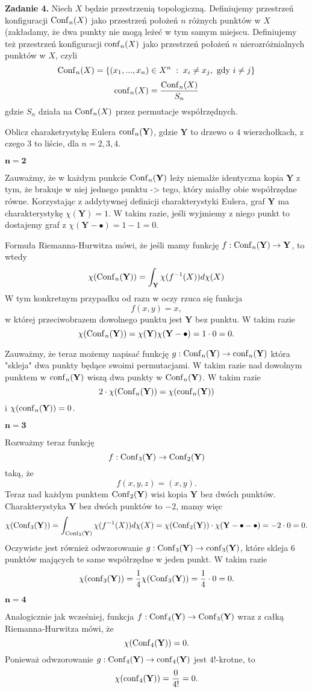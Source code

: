 \textbf{\large\color{orange}Zadanie 4.} Niech $X$ będzie przestrzenią topologiczną. Definiujemy przestrzeń konfiguracji $\operatorname{Conf}_n(X)$ jako przestrzeń położeń $n$ różnych punktów w $X$ (zakładamy, że dwa punkty nie mogą leżeć w tym samym miejscu. Definiujemy też przestrzeń konfiguracji $\operatorname{conf}_n(X)$ jako przestrzeń położeń $n$ nierozróżnialnych punktów w $X$, czyli
$$\operatorname{Conf}_n(X)=\{(x_1,...,x_n)\in X^n\;:\;x_i\neq x_j, \text{ gdy }i\neq j\}$$
$$\operatorname{conf}_n(X)=\frac{\operatorname{Conf}_n(X)}{S_n}$$
gdzie $S_n$ działa na $\operatorname{Conf}_n(X)$ przez permutacje współrzędnych.

Oblicz charaketrystykę Eulera $\operatorname{conf}_n(\mathbf{Y})$, gdzie $\mathbf{Y}$ to drzewo o $4$ wierzchołkach, z czego $3$ to liście, dla $n=2,3,4$.

\dotfill

\textbf{$\mathbf{n=2}$}

Zauważmy, że w każdym punkcie $\operatorname{Conf}_n(\mathbf{Y})$ leży niemalże identyczna kopia $\mathbf{Y}$ z tym, że brakuje w niej jednego punktu -> tego, który miałby obie współrzędne równe. Korzystając z addytywnej definicji charakterystyki Eulera, graf $\mathbf{Y}$ ma charakterystykę $\chi(\mathbf{Y})=1$. W takim razie, jeśli wyjmiemy z niego punkt to dostajemy graf z $\chi(\mathbf{Y}-\bullet)=1-1=0$.

Formuła Riemanna-Hurwitza mówi, że jeśli mamy funkcję $f:\operatorname{Conf}_n(\mathbf{Y})\to \mathbf{Y}$, to wtedy
$$\chi(\operatorname{Conf}_n(\mathbf{Y}))=\int_{\mathbf{Y}}\chi(f^{-1}(X))d\chi(X)$$
W tym konkretnym przypadku od razu w oczy rzuca się funkcja
$$f(x, y)=x,$$
w której przeciwobrazem dowolnego punktu jest $\mathbf{Y}$ bez punktu. W takim razie 
$$\chi(\operatorname{Conf}_n(\mathbf{Y}))=\chi(\mathbf{Y})\chi(\mathbf{Y}-\bullet)=1\cdot 0=0.$$

Zauważmy, że teraz możemy napisać funkcję $g:\operatorname{Conf}_n(\mathbf{Y})\to \operatorname{conf}_n(\mathbf{Y})$ która "skleja" dwa punkty będące swoimi permutacjami. W takim razie nad dowolnym punktem w $\operatorname{conf}_n(\mathbf{Y})$ wiszą dwa punkty w $\operatorname{Conf}_n(\mathbf{Y})$. W takim razie 
$$2\cdot\chi(\operatorname{Conf}_n(\mathbf{Y}))=\chi(\operatorname{conf}_n(\mathbf{Y}))$$
i $\chi(\operatorname{conf}_n(\mathbf{Y}))=0$.
\bigskip

$\mathbf{n=3}$ \dotfill

Rozważmy teraz funkcję 
$$f:\operatorname{Conf}_3(\mathbf{Y})\to \operatorname{Conf}_2(\mathbf{Y})$$ 
taką, że 
$$f(x, y, z)=(x, y).$$
Teraz nad każdym punktem $\operatorname{Conf}_2(\mathbf{Y})$ wisi kopia $\mathbf{Y}$ bez dwóch punktów. Charakterystyka $\mathbf{Y}$ bez dwóch punktów to $-2$, mamy więc
$$\chi(\operatorname{Conf}_3(\mathbf{Y}))=\int_{\operatorname{Conf}_2(\mathbf{Y})}\chi(f^{-1}(X))d\chi(X)=\chi(\operatorname{Conf}_2(\mathbf{Y}))\cdot\chi(\mathbf{Y}-\bullet-\bullet)=-2\cdot0=0.$$
Oczywiste jest również odwzorowanie $g:\operatorname{Conf}_3(\mathbf{Y})\to \operatorname{conf}_3(\mathbf{Y})$, które skleja $6$ punktów mających te same współrzędne w jeden punkt. W takim razie
$$\chi(\operatorname{conf}_3(\mathbf{Y}))=\frac{1}{4}\chi(\operatorname{Conf}_3(\mathbf{Y}))=\frac{1}{4}\cdot 0=0.$$
\bigskip

$\mathbf{n=4}$ \dotfill

Analogicznie jak wcześniej, funkcja $f:\operatorname{Conf}_4(\mathbf{Y})\to \operatorname{Conf}_3(\mathbf{Y})$ wraz z całką Riemanna-Hurwitza mówi, że
$$\chi(\operatorname{Conf}_4(\mathbf{Y}))=0.$$
Ponieważ odwzorowanie $g:\operatorname{Conf}_4(\mathbf{Y})\to \operatorname{conf}_4(\mathbf{Y})$ jest $4!$-krotne, to 
$$\chi(\operatorname{conf}_4(\mathbf{Y}))=\frac{0}{4!}=0.$$
